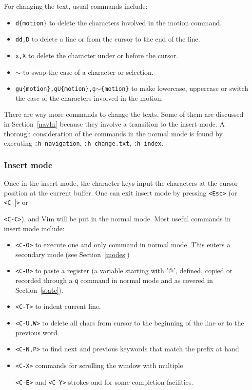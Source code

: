 \documentclass{article}
\newcommand{\ttt}[1] {
	\texttt{<#1>}}
\newcommand{\tttt}[1]{\texttt{#1}}
\begin{document}
For changing the text, usual commands include:
\begin{itemize}
  \item \texttt{d\{motion\}} to delete the characters
    involved in the motion command.
  \item \texttt{dd,D} to delete a line or from the cursor to the end of the line.
  \item \texttt{x,X} to delete the character under or before the cursor.
  \item \texttt{$\sim$} to swap the case of a character or selection.
  \item \texttt{gu\{motion\},gU\{motion\},g$\sim$\{motion\}} to make lowercase, uppercase or switch the case of the characters involved in the motion.
\end{itemize}

There are way more commands to change the texts.
Some of them are discussed in Section~\ref{navIn}
because they involve a transition to the insert mode.
A thorough consideration of the commands in the normal mode
is found by executing \texttt{:h navigation}, 
\texttt{:h change.txt}, \tttt{:h index}.

\subsubsection{Insert mode}\label{sec:ins}
Once in the insert mode, the character keys
input the characters at the cursor position at the current buffer.
One can exit insert mode by pressing \texttt{<Esc>} (or \ttt{C-$[$} or
\ttt{C-C}),
and Vim will be put in the normal mode.
Most useful commands in insert mode include:
\begin{itemize}
  \item \ttt{C-O} to execute one and only command in normal mode.
	  This enters a secondary mode (see Section~\ref{modes})
  \item \ttt{C-R} to paste a register (a variable starting with
    '@', defined, copied or recorded through a \tttt{q} command in
    normal mode and as covered in Section~\ref{state}).
  \item \ttt{C-T} to indent current line.
  \item \ttt{C-U,W} to delete all chars from cursor to the beginning of
    the line or to the previous word.
  \item \ttt{C-N,P} to find next and previous keywords that match the prefix at hand.
  \item \ttt{C-X} commands for scrolling the window with multiple
    \ttt{C-E} and \ttt{C-Y} strokes and for some completion facilities.
\end{itemize}
\end{document}
